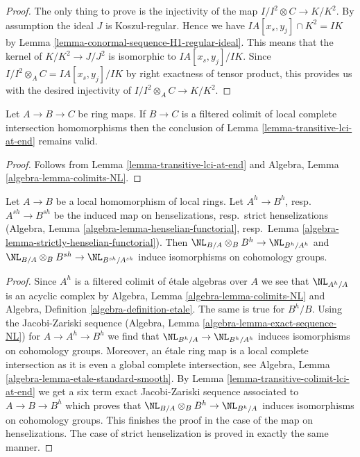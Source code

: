 \begin{proof}
The only thing to prove is the injectivity of the map
$I/I^2 \otimes C \to K/K^2$.
By assumption the ideal $J$ is Koszul-regular.
Hence we have $IA[x_s, y_j] \cap K^2 = IK$ by
Lemma \ref{lemma-conormal-sequence-H1-regular-ideal}.
This means that the kernel of $K/K^2 \to J/J^2$ is
isomorphic to $IA[x_s, y_j]/IK$. Since
$I/I^2 \otimes_A C = IA[x_s, y_j]/IK$ by right exactness
of tensor product, this provides us with the desired injectivity of
$I/I^2 \otimes_A C \to K/K^2$.
\end{proof}

\begin{lemma}
\label{lemma-transitive-colimit-lci-at-end}
Let $A \to B \to C$ be ring maps.
If $B \to C$ is a filtered colimit of local complete intersection
homomorphisms then the conclusion of
Lemma \ref{lemma-transitive-lci-at-end}
remains valid.
\end{lemma}

\begin{proof}
Follows from
Lemma \ref{lemma-transitive-lci-at-end}
and
Algebra, Lemma \ref{algebra-lemma-colimits-NL}.
\end{proof}

\begin{lemma}
\label{lemma-henselization-NL}
Let $A \to B$ be a local homomorphism of local rings.
Let $A^h \to B^h$, resp.\ $A^{sh} \to B^{sh}$ be the induced
map on henselizations, resp.\ strict henselizations
(Algebra, Lemma \ref{algebra-lemma-henselian-functorial},
resp.\ Lemma \ref{algebra-lemma-strictly-henselian-functorial}).
Then $\NL_{B/A} \otimes_B B^h \to \NL_{B^h/A^h}$ and
$\NL_{B/A} \otimes_B B^{sh} \to \NL_{B^{sh}/A^{sh}}$
induce isomorphisms on cohomology groups.
\end{lemma}

\begin{proof}
Since $A^h$ is a filtered colimit of \'etale algebras over $A$
we see that $\NL_{A^h/A}$ is an acyclic complex by
Algebra, Lemma \ref{algebra-lemma-colimits-NL} and
Algebra, Definition \ref{algebra-definition-etale}.
The same is true for $B^h/B$.
Using the Jacobi-Zariski sequence
(Algebra, Lemma \ref{algebra-lemma-exact-sequence-NL})
for $A \to A^h \to B^h$ we find that
$\NL_{B^h/A} \to \NL_{B^h/A^h}$ induces isomorphisms
on cohomology groups. Moreover, an \'etale ring map is
a local complete intersection as it is even a global complete
intersection, see Algebra, Lemma \ref{algebra-lemma-etale-standard-smooth}.
By Lemma \ref{lemma-transitive-colimit-lci-at-end}
we get a six term exact Jacobi-Zariski sequence
associated to $A \to B \to B^h$ which proves that
$\NL_{B/A} \otimes_B B^h \to \NL_{B^h/A}$ induces isomorphisms
on cohomology groups. This finishes the proof in the
case of the map on henselizations. The case of strict henselization
is proved in exactly the same manner.
\end{proof}







